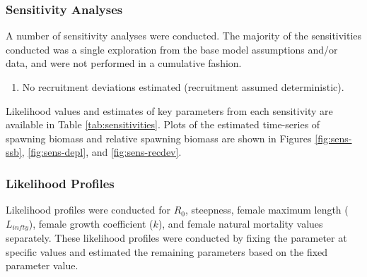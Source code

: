 \documentclass[11pt,
  english,
  a4paper,
]{article}
\begin{document}
\leavevmode\tagmcend\tagstructend\par


\hypertarget{sensitivity-analyses}{%
\subsubsection{Sensitivity Analyses}\label{sensitivity-analyses}}

\leavevmode\tagmcend\tagstructend


A number of sensitivity analyses were conducted. The majority of the sensitivities conducted was a single exploration from the base model assumptions and/or data, and were not performed in a cumulative fashion.

\leavevmode\tagmcend\tagstructend\par

\begin{enumerate} 

    \item No recruitment deviations estimated (recruitment assumed deterministic).

\end{enumerate}


Likelihood values and estimates of key parameters from each sensitivity are available in Table \ref{tab:sensitivities}. Plots of the estimated time-series of spawning biomass and relative spawning biomass are shown in Figures \ref{fig:sens-ssb}, \ref{fig:sens-depl}, and \ref{fig:sens-recdev}.

\leavevmode\tagmcend\tagstructend\par


\hypertarget{likelihood-profiles}{%
\subsubsection{Likelihood Profiles}\label{likelihood-profiles}}

\leavevmode\tagmcend\tagstructend


Likelihood profiles were conducted for {\(R_0\)\leavevmode\tagmcend\tagstructend}, steepness, female maximum length ({\(L_{infty}\)\leavevmode\tagmcend\tagstructend}), female growth coefficient ({\(k\)\leavevmode\tagmcend\tagstructend}), and female natural mortality values separately. These likelihood profiles were conducted by fixing the parameter at specific values and estimated the remaining parameters based on the fixed parameter value.
\end{document}
